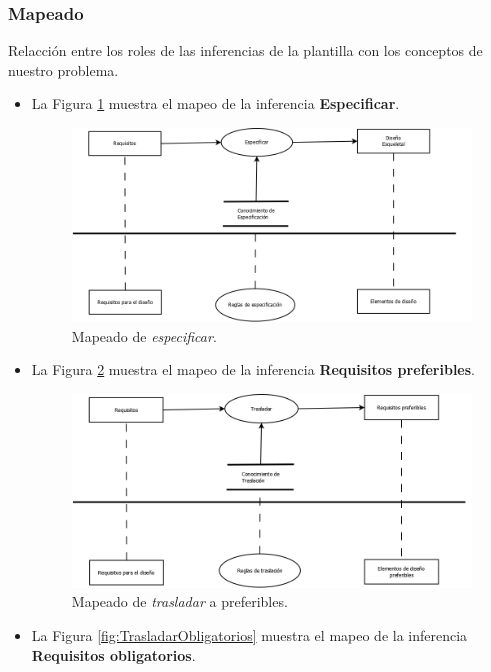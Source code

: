 \subsubsection{Mapeado}

Relacción entre los roles de las inferencias de la plantilla con los conceptos de nuestro problema.

\begin{itemize}
  \item La Figura \ref{fig:Especificar} muestra el mapeo de la inferencia \textbf{Especificar}.
  \begin{figure}[H]
    \centering
    \includegraphics[scale=0.30]{imaxes/Especificar.png}
    \caption{\label{fig:Especificar}Mapeado de \textit{especificar}.}
  \end{figure}
  \item La Figura \ref{fig:TrasladarPreferibles} muestra el mapeo de la inferencia \textbf{Requisitos preferibles}.
  \begin{figure}[H]
    \centering
    \includegraphics[scale=0.30]{imaxes/TrasladarPreferibles.png}
    \caption{\label{fig:TrasladarPreferibles}Mapeado de \textit{trasladar} a preferibles.}
  \end{figure}
  \item La Figura \ref{fig:TrasladarObligatorios} muestra el mapeo de la inferencia \textbf{Requisitos obligatorios}.

\end{itemize}
